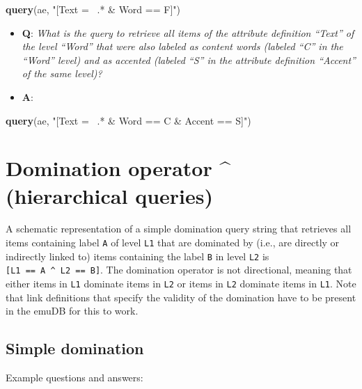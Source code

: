\documentclass[]{book}
\newenvironment{Shaded}{\begin{snugshade}}{\end{snugshade}}
\newcommand{\KeywordTok}[1]{\textcolor[rgb]{0.13,0.29,0.53}{\textbf{#1}}}
\newcommand{\NormalTok}[1]{#1}
\newcommand{\StringTok}[1]{\textcolor[rgb]{0.31,0.60,0.02}{#1}}
\providecommand{\tightlist}{%
  \setlength{\itemsep}{0pt}\setlength{\parskip}{0pt}}
\begin{document}
\begin{Shaded}
\begin{Highlighting}[]
\KeywordTok{query}\NormalTok{(ae, }\StringTok{"[Text =~ .* & Word == F]"}\NormalTok{)}
\end{Highlighting}
\end{Shaded}

\begin{itemize}
\tightlist
\item
  \textbf{Q}: \emph{What is the query to retrieve all items of the attribute definition ``Text'' of the level ``Word'' that were also labeled as content words (labeled ``C'' in the ``Word'' level) and as accented (labeled ``S'' in the attribute definition ``Accent'' of the same level)?}
\item
  \textbf{A}:
\end{itemize}

\begin{Shaded}
\begin{Highlighting}[]
\KeywordTok{query}\NormalTok{(ae, }\StringTok{"[Text =~ .* & Word == C & Accent == S]"}\NormalTok{)}
\end{Highlighting}
\end{Shaded}

\hypertarget{domination-operator-hierarchical-queries}{%
\section{Domination operator \^{} (hierarchical queries)}\label{domination-operator-hierarchical-queries}}

A schematic representation of a simple domination query string that retrieves all items containing label \texttt{A} of level \texttt{L1} that are dominated by (i.e., are directly or indirectly linked to) items containing the label \texttt{B} in level \texttt{L2} is \texttt{{[}L1\ ==\ A\ \^{}\ L2\ ==\ B{]}}. The domination operator is not directional, meaning that either items in \texttt{L1} dominate items in \texttt{L2} or items in \texttt{L2} dominate items in \texttt{L1}. Note that link definitions that specify the validity of the domination have to be present in the emuDB for this to work.

\hypertarget{simple-domination}{%
\subsection{Simple domination}\label{simple-domination}}

Example questions and answers:
\end{document}
